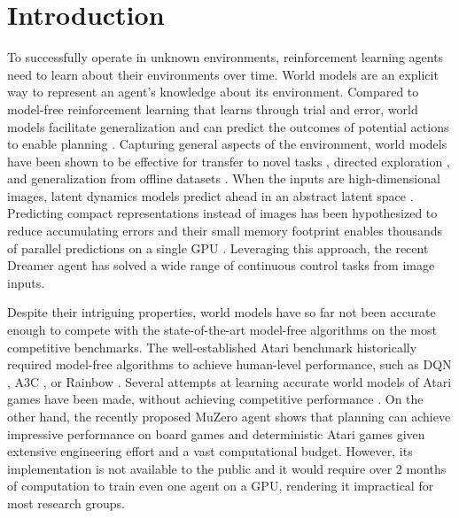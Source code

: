 \section{Introduction}
\label{sec:intro}



To successfully operate in unknown environments, reinforcement learning agents need to learn about their environments over time. World models are an explicit way to represent an agent's knowledge about its environment. Compared to model-free reinforcement learning that learns through trial and error, world models facilitate generalization and can predict the outcomes of potential actions to enable planning \citep{sutton1991dyna}. Capturing general aspects of the environment, world models have been shown to be effective for transfer to novel tasks \citep{byravan2019ivg}, directed exploration \citep{sekar2020plan2explore}, and generalization from offline datasets \citep{yu2020mopo}. When the inputs are high-dimensional images, latent dynamics models predict ahead in an abstract latent space \citep{watter2015e2c,ha2018worldmodels,hafner2018planet,zhang2018solar}. Predicting compact representations instead of images has been hypothesized to reduce accumulating errors and their small memory footprint enables thousands of parallel predictions on a single GPU \citep{hafner2018planet,hafner2019dreamer}. Leveraging this approach, the recent Dreamer agent \citep{hafner2019dreamer} has solved a wide range of continuous control tasks from image inputs.

Despite their intriguing properties, world models have so far not been accurate enough to compete with the state-of-the-art model-free algorithms on the most competitive benchmarks. The well-established Atari benchmark \citep{bellemare2013ale} historically required model-free algorithms to achieve human-level performance, such as DQN \citep{mnih2015dqn}, A3C \citep{mnih2016a3c}, or Rainbow \citep{hessel2018rainbow}. Several attempts at learning accurate world models of Atari games have been made, without achieving competitive performance \citep{oh2015atari,chiappa2017recenvsim,kaiser2019simple}. On the other hand, the recently proposed MuZero agent \citep{schrittwieser2019muzero} shows that planning can achieve impressive performance on board games and deterministic Atari games given extensive engineering effort and a vast computational budget. However, its implementation is not available to the public and it would require over 2 months of computation to train even one agent on a GPU, rendering it impractical for most research groups.

